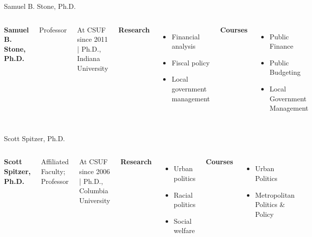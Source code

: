 \documentclass[10pt]{beamer}
\begin{document}
\begin{frame}{Samuel B. Stone, Ph.D.}
\begin{columns}[T,onlytextwidth]
    \raggedright
    {\large\bfseries Samuel B. Stone, Ph.D.}\par
    {Professor}\par
    {\footnotesize At CSUF since 2011 \quad | \quad Ph.D., Indiana University}\par\vspace{0.4em}

    \textbf{Research}
    \begin{itemize}
      \item Financial analysis
      \item Fiscal policy
      \item Local government management
    \end{itemize}

    \textbf{Courses}
    \begin{itemize}
      \item Public Finance
      \item Public Budgeting
      \item Local Government Management
    \end{itemize}

    \vspace*{0.25cm}
\end{columns}
\end{frame}

\begin{frame}{Scott Spitzer, Ph.D.}
\begin{columns}[T,onlytextwidth]
    \raggedright
    {\large\bfseries Scott Spitzer, Ph.D.}\par
    {Affiliated Faculty; Professor}\par
    {\footnotesize At CSUF since 2006 \quad | \quad Ph.D., Columbia University}\par\vspace{0.4em}

    \textbf{Research}
    \begin{itemize}
      \item Urban politics
      \item Racial politics
      \item Social welfare
    \end{itemize}

    \textbf{Courses}
    \begin{itemize}
      \item Urban Politics
      \item Metropolitan Politics \& Policy
    \end{itemize}

    \vspace*{0.25cm}
\end{columns}
\end{frame}
\end{document}
